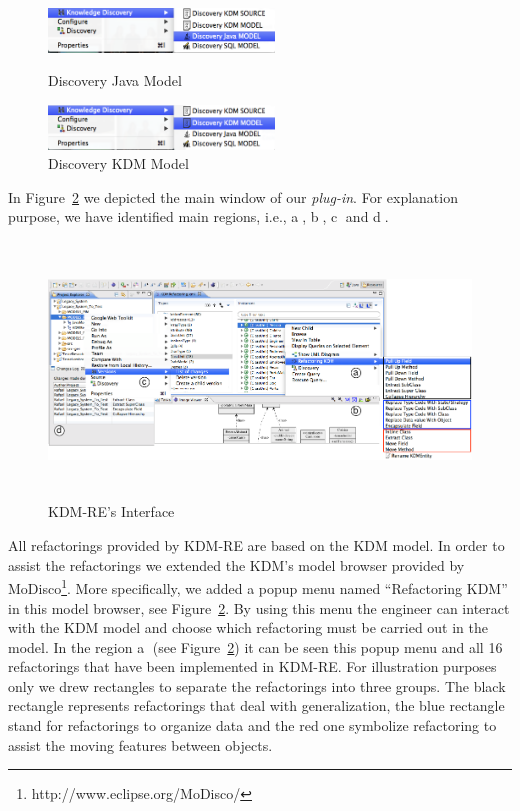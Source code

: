 \begin{figure}
\centering
\begin{minipage}{.5\textwidth}
  \centering
  \includegraphics[width=6cm]{figure/discovery_java_model}
  \caption{Discovery Java Model}
  \label{fig:discovery_java_model}
\end{minipage}%
\begin{minipage}{.5\textwidth}
  \centering
  \includegraphics[width=6cm]{figure/discovery_kdm_model}
  \caption{Discovery KDM Model}
  \label{fig:discovery_kdm_model}
\end{minipage}
\end{figure}

In Figure~\ref{fig:interface} we depicted the main window of our \textit{plug-in}. 
For explanation purpose, we have identified main regions, i.e., \textcircled{a}, \textcircled{b}, \textcircled{c} and \textcircled{d}.

\begin{figure}[!ht]
\centering
  \includegraphics[width=15cm, height=6.8cm]{figure/ScreenShot_tool}
\caption{KDM-RE's Interface}
\label{fig:interface}
\end{figure}

All refactorings provided by KDM-RE are based on the KDM model. 
In order to assist the refactorings we extended the KDM's model browser provided by MoDisco\footnote{http://www.eclipse.org/MoDisco/}. 
More specifically, we added a popup menu named ``Refactoring KDM'' in this model browser, see Figure~\ref{fig:interface}.
By using this menu the engineer can interact with the KDM model and choose which refactoring must be carried out in the model.
In the region \textcircled{a} (see Figure~\ref{fig:interface}) it can be seen this popup menu and all 16 refactorings that have been implemented in KDM-RE. 
For illustration purposes only we drew rectangles to separate the refactorings into three groups. 
The black rectangle represents refactorings that deal with generalization, the blue rectangle stand for refactorings to organize data and the red one symbolize refactoring to assist the moving features between objects.

